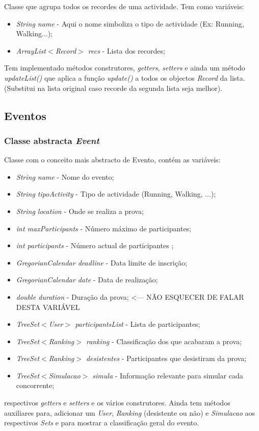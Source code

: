 \documentclass[10pt,notitlepage]{article}
\begin{document}
Classe que agrupa todos os recordes de uma actividade. Tem como variáveis:
\begin{itemize}
\item \textit{String name} - Aqui o nome simboliza o tipo de actividade (Ex: Running, Walking...);
\item \textit{ArrayList$<$Record$>$ recs} - Lista dos recordes;
\end{itemize}
Tem implementado métodos construtores, \textit{getters}, \textit{setters} e ainda um método \textit{updateList()} que aplica a função \textit{update()} a todos os objectos \textit{Record} da lista. (Substitui na lista original caso recorde da segunda lista seja melhor).







\subsection{Eventos}

\subsubsection{Classe abstracta \textit{Event}}
Classe com o conceito mais abstracto de Evento, contém as variáveis:
\begin{itemize}
\item \textit{String name} - Nome do evento;
\item \textit{String tipoActivity} - Tipo de actividade (Running, Walking, ...);
\item \textit{String location} - Onde se realiza a prova;
\item \textit{int maxParticipants} - Número máximo de participantes;
\item \textit{int participants} - Número actual de participantes ;
\item \textit{GregorianCalendar deadline} - Data limite de inscrição;
\item \textit{GregorianCalendar date} - Data de realização;
\item \textit{double duration} - Duração da prova;  <--- NÃO ESQUECER DE FALAR DESTA VARIÁVEL
\item \textit{TreeSet$<$User$>$ participantsList} - Lista de participantes;
\item \textit{TreeSet$<$Ranking$>$ ranking} - Classificação dos que acabaram a prova;
\item \textit{TreeSet$<$Ranking$>$ desistentes} - Participantes que desistiram da prova;
\item \textit{TreeSet$<$Simulacao$>$ simula} - Informação relevante para simular cada concorrente;
\end{itemize}
respectivos \textit{getters} e \textit{setters} e os vários construtores. Ainda tem métodos auxiliares para, adicionar um \textit{User}, \textit{Ranking} (desistente ou não) e \textit{Simulacao} aos respectivos \textit{Sets} e para mostrar a classificação geral do evento.
\end{document}
